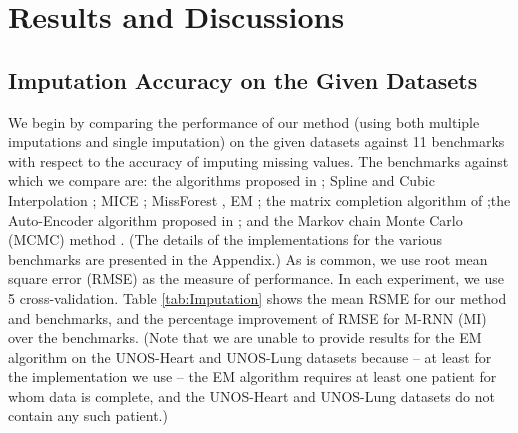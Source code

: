 \documentclass{article}
\begin{document}
	
		
    \section{Results and Discussions}
    \subsection{Imputation Accuracy on the Given Datasets}  
    We begin by comparing the performance of our method (using both multiple imputations and single imputation) on the  given datasets against 11 benchmarks with respect to the accuracy of imputing missing values. The benchmarks against which we compare are: the algorithms proposed in \cite{Recent_RNN1,Recent_RNN2,Recent_RNN3}; Spline and Cubic Interpolation \cite{interpolation} ; MICE \cite{MICE}; MissForest \cite{missforest}, EM \cite{EM}; the matrix completion algorithm of \cite{Mat-0};the Auto-Encoder algorithm proposed in \cite{autoencoder}; and the Markov chain Monte Carlo (MCMC) method \cite{mcmc}. (The details of the implementations for the various benchmarks are presented in the Appendix.)  As is common, we use root mean square error (RMSE) as the measure of performance. In each experiment, we use 5 cross-validation. Table \ref{tab:Imputation} shows the mean RSME for our method and benchmarks, and the percentage improvement of RMSE for M-RNN (MI) over the benchmarks. (Note that we are unable to provide results for the EM algorithm on the UNOS-Heart and UNOS-Lung datasets because -- at least for the implementation we use -- the EM algorithm requires at least one patient for whom data is complete, and the UNOS-Heart and UNOS-Lung datasets do not contain any such patient.) 
    
\end{document}

